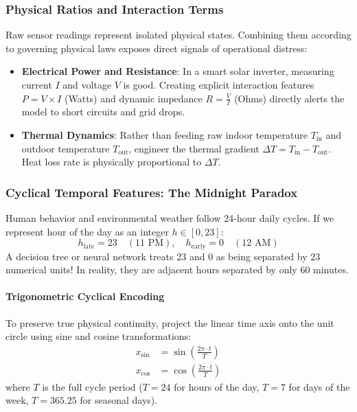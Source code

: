 \subsubsection{Physical Ratios and Interaction Terms}
Raw sensor readings represent isolated physical states. Combining them according to governing physical laws exposes direct signals of operational distress:
\begin{itemize}
    \item \textbf{Electrical Power and Resistance}: In a smart solar inverter, measuring current $I$ and voltage $V$ is good. Creating explicit interaction features $P = V \times I$ (Watts) and dynamic impedance $R = \frac{V}{I}$ (Ohms) directly alerts the model to short circuits and grid drops.
    \item \textbf{Thermal Dynamics}: Rather than feeding raw indoor temperature $T_{\text{in}}$ and outdoor temperature $T_{\text{out}}$, engineer the thermal gradient $\Delta T = T_{\text{in}} - T_{\text{out}}$. Heat loss rate is physically proportional to $\Delta T$.
\end{itemize}

\subsubsection{Cyclical Temporal Features: The Midnight Paradox}
Human behavior and environmental weather follow 24-hour daily cycles. If we represent hour of the day as an integer $h \in [0, 23]$:
\begin{equation*}
h_{\text{late}} = 23 \quad (11\text{ PM}), \quad h_{\text{early}} = 0 \quad (12\text{ AM})
\end{equation*}
A decision tree or neural network treats $23$ and $0$ as being separated by $23$ numerical units! In reality, they are adjacent hours separated by only $60$ minutes.

\paragraph{Trigonometric Cyclical Encoding}
To preserve true physical continuity, project the linear time axis onto the unit circle using sine and cosine transformations:
\begin{align}
x_{\sin} &= \sin\left( \frac{2\pi \cdot t}{T} \right) \label{eq:cyclical_sin}\\
x_{\cos} &= \cos\left( \frac{2\pi \cdot t}{T} \right) \label{eq:cyclical_cos}
\end{align}
where $T$ is the full cycle period ($T = 24$ for hours of the day, $T = 7$ for days of the week, $T = 365.25$ for seasonal days).

